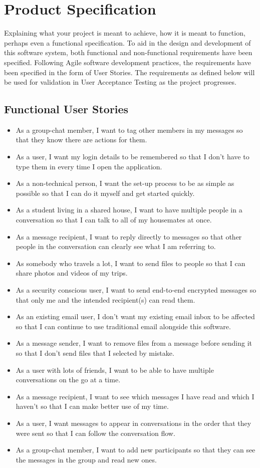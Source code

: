 \chapter{Product Specification}

Explaining what your project is meant to achieve, how it is meant to function, perhaps even a functional specification.
To aid in the design and development of this software system, both functional and non-functional requirements have been specified. Following Agile software development practices, the requirements have been specified in the form of User Stories. The requirements as defined below will be used for validation in User Acceptance Testing as the project progresses.

\section{Functional User Stories}
\begin{itemize}
  \item As a group-chat member, I want to tag other members in my messages so that they know there are actions for them.
  \item As a user, I want my login details to be remembered so that I don't have to type them in every time I open the application.
  \item As a non-technical person, I want the set-up process to be as simple as possible so that I can do it myself and get started quickly.
  \item As a student living in a shared house, I want to have multiple people in a conversation so that I can talk to all of my housemates at once.
  \item As a message recipient, I want to reply directly to messages so that other people in the conversation can clearly see what I am referring to.
  \item As somebody who travels a lot, I want to send files to people so that I can share photos and videos of my trips.
  \item As a security conscious user, I want to send end-to-end encrypted messages so that only me and the intended recipient(s) can read them.
  \item As an existing email user, I don't want my existing email inbox to be affected so that I can continue to use traditional email alongside this software.
  \item As a message sender, I want to remove files from a message before sending it so that I don't send files that I selected by mistake.
  \item As a user with lots of friends, I want to be able to have multiple conversations on the go at a time.
  \item As a message recipient, I want to see which messages I have read and which I haven't so that I can make better use of my time.
  \item As a user, I want messages to appear in conversations in the order that they were sent so that I can follow the conversation flow.
  \item As a group-chat member, I want to add new participants so that they can see the messages in the group and read new ones.
\end{itemize}